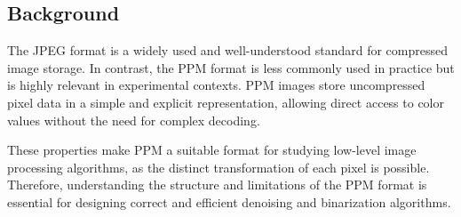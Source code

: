 \subsection{Background}\label{subsec:background}

The JPEG format is a widely used and well-understood standard for compressed image storage. 
In contrast, the PPM format is less commonly used in practice but is highly relevant in experimental contexts.
PPM images store uncompressed pixel data in a simple and explicit representation, allowing direct access to color values without the need for complex decoding.

These properties make PPM a suitable format for studying low-level image processing algorithms, as the distinct transformation of each pixel is possible.
Therefore, understanding the structure and limitations of the PPM format is essential for designing correct and efficient denoising and binarization algorithms.

